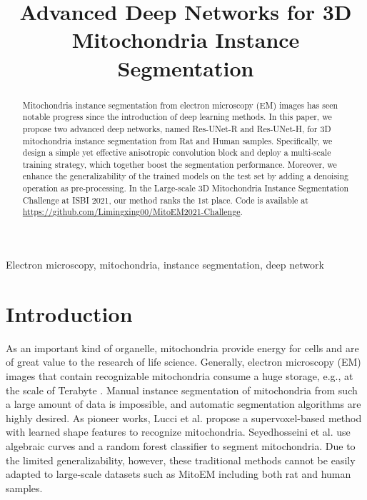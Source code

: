 \documentclass{article}
\title{Advanced Deep Networks for 3D Mitochondria Instance Segmentation}
\begin{document}
\maketitle
\begin{abstract}
\renewcommand{\thefootnote}{}

Mitochondria instance segmentation from electron microscopy (EM) images has seen notable progress since the introduction of deep learning methods. In this paper, we propose two advanced deep networks, named Res-UNet-R and Res-UNet-H, for 3D mitochondria instance segmentation from Rat and Human samples. Specifically, we design a simple yet effective anisotropic convolution block and deploy a multi-scale training strategy, which together boost the segmentation performance. Moreover, we enhance the generalizability of the trained models on the test set by adding a denoising operation as pre-processing. In the Large-scale 3D Mitochondria Instance Segmentation Challenge at ISBI 2021, our method ranks the 1st place. Code is available at \url{https://github.com/Limingxing00/MitoEM2021-Challenge}.






\end{abstract}
\begin{keywords}
Electron microscopy, mitochondria, instance segmentation, deep network
\end{keywords}


\section{Introduction}
\label{sec:introduction}
As an important kind of organelle, mitochondria provide energy for cells and are of great value to the research of life science. Generally, electron microscopy (EM) images that contain recognizable mitochondria  consume a huge storage, e.g., at the scale of Terabyte \cite{motta2019dense}.
Manual instance segmentation of mitochondria from such a large amount of data is  impossible, and automatic segmentation algorithms are highly desired. As pioneer works,
Lucci et al. \cite{lucchi2011supervoxel} propose a supervoxel-based method with learned  shape features to recognize mitochondria.
Seyedhosseini et al. \cite{seyedhosseini2013segmentation} use algebraic curves and a random forest classifier to segment mitochondria. 
Due to the limited generalizability, however, these traditional methods cannot be easily adapted to large-scale datasets such as MitoEM \cite{wei2020mitoem} including both rat and human samples.
\end{document}
